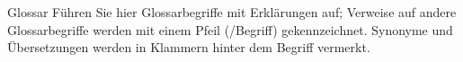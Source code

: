 Glossar
Führen Sie hier Glossarbegriffe mit Erklärungen auf; Verweise auf andere Glossarbegriffe werden mit einem Pfeil (/Begriff) gekennzeichnet. Synonyme und Übersetzungen werden in Klammern hinter dem Begriff vermerkt.
